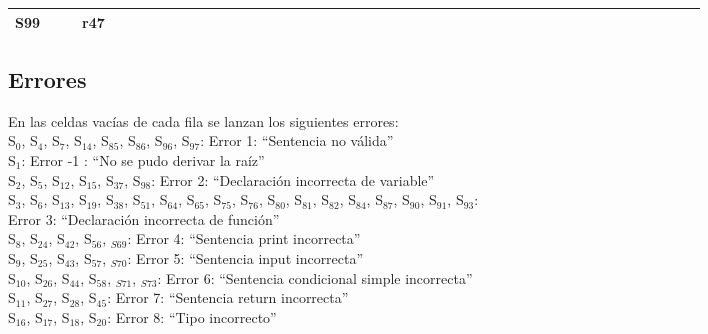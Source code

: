 \documentclass[a4paper, 12pt]{article}
\begin{document}
\begin{table}[htbp]
\begin{turn}{90}
{\begin{tabular}{|l|c|c|c|c|c|c|c|c|c|c|c|c|c|c|c|c|c|c|c|c|c|c|c|c|c||c|c|c|c|c|c|c|c|c|c|c|c|c|c|c|c|c|c|c|c|}
    \midrule
    S99   &       &       & r47   &       &       &       &       &       &       &       &       &       &       &       &       &       &       &       &       &       &       &       &       &       &       &       &       &       &       &       &       &       &       &       &       &       &       &       &       &       &       &       &       &       &  \\
 \bottomrule
    \end{tabular}} %
\end{turn}
  \label{tab:addlabel}%
\end{table}%

\newpage
\subsection{Errores}
En las celdas vacías de cada fila se lanzan los siguientes errores:\\

S$_0$, S$_4$, S$_7$, S$_{14}$, S$_{85}$, S$_{86}$, S$_{96}$, S$_{97}$: Error 1: “Sentencia no válida” \\

S$_{1}$: Error -1 : “No se pudo derivar la raíz”\\

S$_{2}$, S$_{5}$, S$_{12}$, S$_{15}$, S$_{37}$, S$_{98}$: Error 2: “Declaración incorrecta de variable”\\

S$_{3}$, S$_{6}$, S$_{13}$, S$_{19}$, S$_{38}$, S$_{51}$, S$_{64}$, S$_{65}$, S$_{75}$, S$_{76}$, S$_{80}$, S$_{81}$, S$_{82}$, S$_{84}$, S$_{87}$, S$_{90}$, S$_{91}$, S$_{93}$:\\
\indent Error 3: “Declaración incorrecta de función”\\

S$_{8}$, S$_{24}$, S$_{42}$, S$_{56}$, $_{S69}$: Error 4: “Sentencia print incorrecta”\\

S$_{9}$, S$_{25}$, S$_{43}$, S$_{57}$, $_{S70}$: Error 5: “Sentencia input incorrecta”\\

S$_{10}$, S$_{26}$, S$_{44}$, S$_{58}$, $_{S71}$, $_{S73}$: Error 6: “Sentencia condicional simple incorrecta”\\

S$_{11}$, S$_{27}$, S$_{28}$, S$_{45}$: Error 7: “Sentencia return incorrecta”\\

S$_{16}$, S$_{17}$, S$_{18}$, S$_{20}$: Error 8: “Tipo incorrecto”\\
\end{document}
